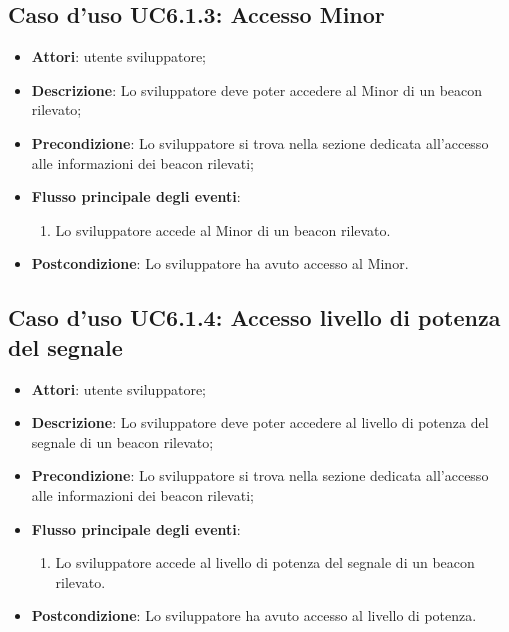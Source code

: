 \documentclass[../AnalisiDeiRequisiti.tex]{subfiles}
\begin{document}
\subsection{Caso d'uso UC6.1.3: Accesso Minor}
\begin{itemize}
	\item \textbf{Attori}: utente sviluppatore;
	\item \textbf{Descrizione}: Lo sviluppatore deve poter accedere al Minor di un beacon rilevato; 
	\item \textbf{Precondizione}: Lo sviluppatore si trova nella sezione dedicata all'accesso alle informazioni dei beacon rilevati;
	
	\item \textbf{Flusso principale degli eventi}:
	\begin{enumerate}
		\item Lo sviluppatore accede al Minor di un beacon rilevato.
		
	\end{enumerate}
	\item \textbf{Postcondizione}: Lo sviluppatore ha avuto accesso al Minor.
\end{itemize}
\hypertarget{UC6.1.4}{}
\subsection{Caso d'uso UC6.1.4: Accesso livello di potenza del segnale}
\begin{itemize}
	\item \textbf{Attori}: utente sviluppatore;
	\item \textbf{Descrizione}: Lo sviluppatore deve poter accedere al livello di potenza del segnale di un beacon rilevato; 
	\item \textbf{Precondizione}: Lo sviluppatore si trova nella sezione dedicata all'accesso alle informazioni dei beacon rilevati;
	
	\item \textbf{Flusso principale degli eventi}:
	\begin{enumerate}
		\item Lo sviluppatore accede al livello di potenza del segnale di un beacon rilevato.
		
	\end{enumerate}
	\item \textbf{Postcondizione}: Lo sviluppatore ha avuto accesso al livello di potenza.
\end{itemize}
\hypertarget{UC6.1.5}{}
\end{document}
